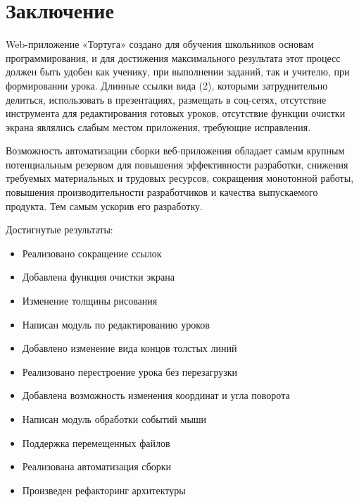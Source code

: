 \chapter*{Заключение}						%

Web-приложение «Тортуга» создано для обучения школьников основам программирования, и для достижения максимального результата этот процесс должен быть удобен как ученику, при выполнении заданий, так и учителю, при формировании урока. Длинные ссылки вида (2), которыми затруднительно делиться, использовать в презентациях, размещать в соц-сетях, отсутствие инструмента для редактирования готовых уроков, отсутствие функции очистки экрана являлись слабым местом приложения, требующие исправления.\par

Возможность  автоматизации сборки веб-приложения обладает самым крупным потенциальным резервом для повышения эффективности разработки, снижения требуемых материальных и трудовых ресурсов, сокращения монотонной работы, повышения производительности разработчиков и качества выпускаемого продукта. Тем самым ускорив его разработку.\par
\vspace{16mm}
Достигнутые результаты:
\begin{itemize}
  \item Реализовано сокращение ссылок
  \item Добавлена функция очистки экрана
  \item Изменение толщины рисования
  \item Написан модуль по редактированию уроков
  \item Добавлено изменение вида концов толстых линий
  \item Реализовано перестроение урока без перезагрузки
  \item Добавлена возможность изменения координат и угла поворота
  \item Написан модуль обработки событий мыши
  \item Поддержка перемещенных файлов
  \item Реализована автоматизация сборки
  \item Произведен рефакторинг архитектуры
  
\end{itemize}


\clearpage